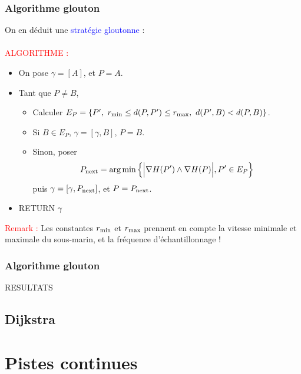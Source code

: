 \documentclass[11pt]{beamer}
\DeclareMathOperator*{\argmin}{arg\,min}
\begin{document}



\begin{frame}

\frametitle{Algorithme glouton}

On en déduit une \textcolor{blue}{stratégie gloutonne} : \\
~\\
\textcolor{red}{ALGORITHME :}\\
\begin{itemize}
    \item On pose $\gamma = [A]$, et $P = A$.
    \item Tant que $P \neq B$,
    \begin{itemize}
        \item Calculer $E_P = \{P', \ r_{\rm min} \le d(P, P') \le r_{\rm max}, \ d(P', B) < d(P, B) \}$.
        \item Si $B \in E_P$, $\gamma = [\gamma, B]$, $P = B$.
        \item Sinon, poser
        \[
            P_{\rm next} = \argmin \left\{ \Big| \nabla H(P') \wedge \nabla H(P) \Big|, P' \in E_P    \right\}
        \]
        puis $\gamma = [\gamma, P_{\rm next}]$, et $P = P_{\rm next}$.
    \end{itemize}
    \item RETURN $\gamma$
\end{itemize}

\textcolor{red}{Remark :}
Les constantes $r_{\rm min}$ et $r_{\rm max}$ prennent en compte la vitesse minimale et maximale du sous-marin, et la fréquence d'échantillonnage !


\end{frame}



\begin{frame}

\frametitle{Algorithme glouton}

RESULTATS
\end{frame}
\subsection{Dijkstra}
\section{Pistes continues}
\end{document}
